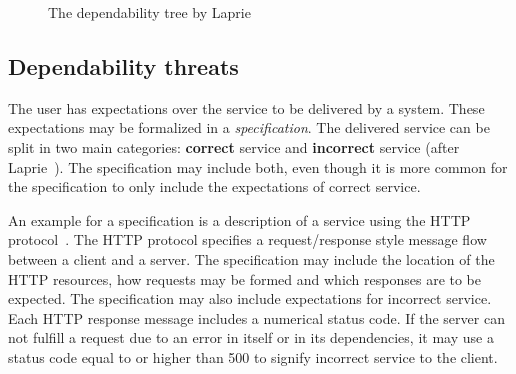 \begin{figure}[ht]
  \centering
  \caption{The dependability tree by Laprie~\cite{Laprie2000}}
  \label{fig:laprie}
\end{figure}


\subsection{Dependability threats}
\label{subsec:dependability_threats}

The user has expectations over the service to be delivered by a system. These expectations may be formalized in a \emph{specification}. The delivered service can be split in two main categories: \textbf{correct} service and \textbf{incorrect} service (after Laprie~\cite{Laprie2004}). The specification may include both, even though it is more common for the specification to only include the expectations of correct service.

An example for a specification is a description of a service using the HTTP protocol~\cite{rfc2616}. The HTTP protocol specifies a request/response style message flow between a client and a server. The specification may include the location of the HTTP resources, how requests may be formed and which responses are to be expected. The specification may also include expectations for incorrect service. Each HTTP response message includes a numerical status code. If the server can not fulfill a request due to an error in itself or in its dependencies, it may use a status code equal to or higher than 500 to signify incorrect service to the client.

